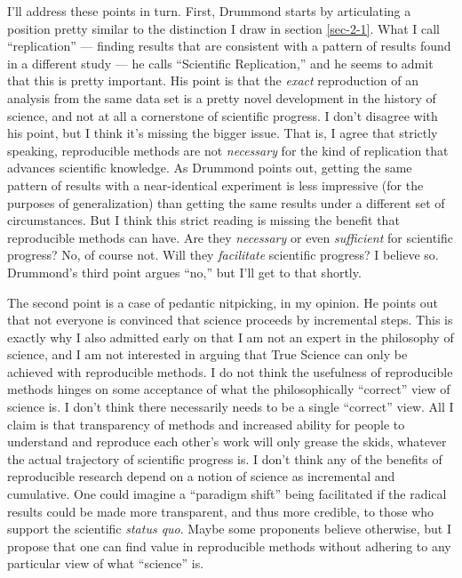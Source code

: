 \documentclass{book}
\begin{document}
I'll address these points in turn. First, Drummond starts by articulating a position pretty similar to the distinction I draw in section \ref{sec-2-1}. What I call ``replication'' --- finding results that are consistent with a pattern of results found in a different study --- he calls ``Scientific Replication,'' and he seems to admit that this is pretty important. His point is that the \emph{exact} reproduction of an analysis from the same data set is a pretty novel development in the history of science, and not at all a cornerstone of scientific progress. I don't disagree with his point, but I think it's missing the bigger issue. That is, I agree that strictly speaking, reproducible methods are not \emph{necessary} for the kind of replication that advances scientific knowledge. As Drummond points out, getting the same pattern of results with a near-identical experiment is less impressive (for the purposes of generalization) than getting the same results under a different set of circumstances.  But I think this strict reading is missing the benefit that reproducible methods can have. Are they \emph{necessary} or even \emph{sufficient} for scientific progress? No, of course not. Will they \emph{facilitate} scientific progress?  I believe so. Drummond's third point argues ``no,'' but I'll get to that shortly.

The second point is a case of pedantic nitpicking, in my opinion. He points out that not everyone is convinced that science proceeds by incremental steps. This is exactly why I also admitted early on that I am not an expert in the philosophy of science, and I am not interested in arguing that True Science can only be achieved with reproducible methods. I do not think the usefulness of reproducible methods hinges on some acceptance of what the philosophically ``correct'' view of science is. I don't think there necessarily needs to be a single ``correct'' view. All I claim is that transparency of methods and increased ability for people to understand and reproduce each other's work will only grease the skids, whatever the actual trajectory of scientific progress is. I don't think any of the benefits of reproducible research depend on a notion of science as incremental and cumulative.  One could imagine a ``paradigm shift'' being facilitated if the radical results could be made more transparent, and thus more credible, to those who support the scientific \emph{status quo}. Maybe some proponents believe otherwise, but I propose that one can find value in reproducible methods without adhering to any particular view of what ``science'' is.
\end{document}
